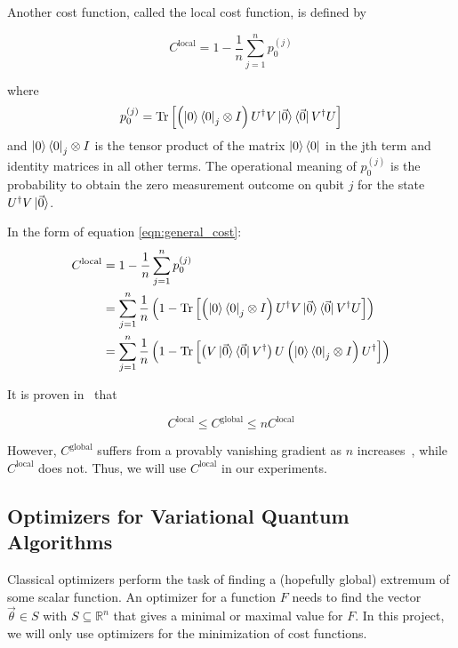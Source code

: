 \documentclass[a4paper,12pt]{article}
\newcommand{\thetas}{\vec{\theta}}
\DeclareMathOperator{\tr}{Tr}
\begin{document}
Another cost function, called the local cost function, is defined by 

\begin{equation}
    C^{\textrm{local}} = 1 - \frac{1}{n} \sum_{j=1}^{n} p_0^{(j)}
\end{equation}

where
\begin{equation} \label{eqn:local_vqc_cost}
    p_0^{(j)} = \tr \left[\left({\ket{0}\bra{0}}_j \otimes I\right) U^\dagger V \ket{\vec{0}}\bra{\vec{0}} V^\dagger U \right]
\end{equation}
and ${\ket{0}\bra{0}}_j \otimes I$ is the tensor product of the matrix $\ket{0}\bra{0}$ in the jth term and identity matrices in all other terms.
The operational meaning of $p_0^{(j)}$ is the probability to obtain the zero measurement outcome on qubit $j$ for the state $U^\dagger V\ket{\vec{0}}$.

In the form of equation \ref{eqn:general_cost}:
\begin{align*}
    C^{\textrm{local}} &= 1 - \frac{1}{n} \sum_{j=1}^{n} p_0^{(j)} \\
    &= \sum_{j=1}^n \frac{1}{n} \left(1 - \tr\left[\left({\ket{0}\bra{0}}_j \otimes I\right) U^\dagger V \ket{\vec{0}}\bra{\vec{0}} V^\dagger U\right] \right) \\
    &= \sum_{j=1}^n \frac{1}{n} \left(1 - \tr\left[ \left(V \ket{\vec{0}}\bra{\vec{0}} V^\dagger\right) U \left({\ket{0}\bra{0}}_j \otimes I\right) U^\dagger\right] \right)
\end{align*}

It is proven in~\cite{sharma_noise_2020} that

\begin{equation}
    C^{\textrm{local}} \leq C^{\textrm{global}} \leq nC^{\textrm{local}}
\end{equation} 

However, $C^\textrm{global}$ suffers from a provably vanishing gradient as $n$ increases~\cite{cerezo_cost_2021}, while $C^\textrm{local}$ does not. Thus, we will use $C^\textrm{local}$ in our experiments.

\subsection{Optimizers for Variational Quantum Algorithms} \label{subsec:optimizers}
Classical optimizers perform the task of finding a (hopefully global) extremum of some scalar function.
An optimizer for a function $F$ needs to find the vector $\thetas \in S$ with $S \subseteq \mathbb{R}^n$ that gives a minimal or maximal value for $F$. In this project, we will only use optimizers for the minimization of cost functions.
\end{document}
